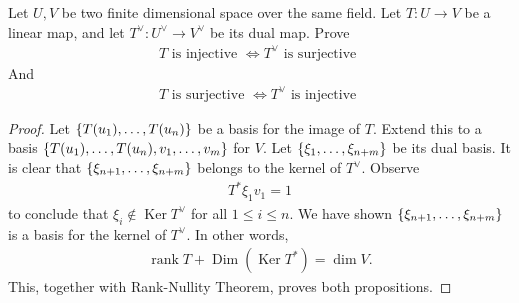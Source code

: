 \documentclass{report}
\begin{document}
\begin{question}{}{}
  Let $U,V$ be two finite dimensional space over the same field. Let  $T:U\rightarrow V$ be a linear map, and let $T^\vee:U^\vee\rightarrow V^\vee$ be its dual map. Prove 
\begin{align*}
T\text{ is injective }\iff T^\vee\text{ is surjective }   
\end{align*}
And 
\begin{align*}
T\text{ is surjective }\iff T^\vee\text{ is injective }
\end{align*}
\end{question}
\begin{proof}
Let $\left\{ T(u_1),\dots ,T(u_n) \right\}$ be a basis for the image of $T$. Extend this to a basis $\left\{ T(u_1),\dots ,T(u_n),v_1,\dots ,v_m \right\}$ for $V$. Let $\left\{ \xi_1,\dots ,\xi_{n+m} \right\}$ be its dual basis. It is clear that $\left\{ \xi_{n+1},\dots ,\xi_{n+m} \right\}$ belongs to the kernel of $T^\vee$. Observe  
\begin{align*}
T^*\xi_1v_1 = 1
\end{align*}
to conclude that $\xi_i \not\in \operatorname{Ker}T^\vee$ for all $1\leq i\leq n$. We have shown $\left\{ \xi_{n+1},\dots ,\xi_{n+m} \right\}$ is a basis for the kernel of $T^\vee$. In other words,  
\begin{align*}
   \operatorname{rank}T+\operatorname{Dim}(\operatorname{Ker}T^*)= \operatorname{dim}V.
\end{align*}
This, together with Rank-Nullity Theorem, proves both propositions.
\end{proof}
\end{document}
